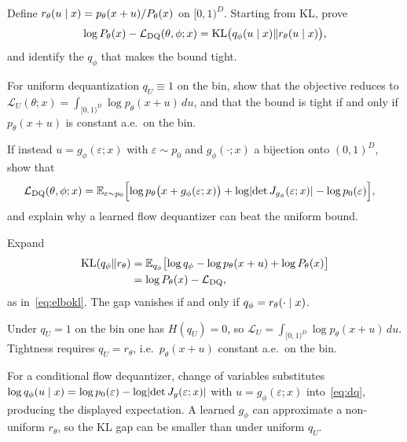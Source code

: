 \begin{hwqbox}
Define $r_\theta(u\mid x)=p_\theta(x+u)/P_\theta(x)$ on $[0,1)^D$. Starting from KL, prove
\[
\log P_\theta(x)-\mathcal L_{\mathrm{DQ}}(\theta,\phi;x)
=\mathrm{KL}\bigl(q_\phi(u\mid x)\Vert r_\theta(u\mid x)\bigr),
\]
and identify the $q_\phi$ that makes the bound tight.

For uniform dequantization $q_U\equiv 1$ on the bin, show that the objective reduces to
$\mathcal L_U(\theta;x)=\int_{[0,1)^D}\log p_\theta(x+u)\,du$, and that the bound is tight if and only if $p_\theta(x+u)$ is constant a.e.\ on the bin.

If instead $u=g_\phi(\varepsilon;x)$ with $\varepsilon\sim p_0$ and $g_\phi(\cdot;x)$ a bijection onto $(0,1)^D$, show that
\begin{align*}
\mathcal L_{\mathrm{DQ}}(\theta,\phi;x)
&=\mathbb{E}_{\varepsilon\sim p_0}\Bigl[
\log p_\theta\bigl(x+g_\phi(\varepsilon;x)\bigr)
+\log\lvert\det J_{g_\phi}(\varepsilon;x)\rvert
-\log p_0(\varepsilon)
\Bigr],
\end{align*}
and explain why a learned flow dequantizer can beat the uniform bound.
\end{hwqbox}
\begin{hwsolbox}
Expand
\begin{align*}
\mathrm{KL}(q_\phi\Vert r_\theta)
&=\mathbb{E}_{q_\phi}\bigl[\log q_\phi-\log p_\theta(x+u)+\log P_\theta(x)\bigr]\\
&=\log P_\theta(x)-\mathcal L_{\mathrm{DQ}},
\end{align*}
as in~\eqref{eq:elbokl}. The gap vanishes if and only if $q_\phi=r_\theta(\cdot\mid x)$.

Under $q_U=1$ on the bin one has $H(q_U)=0$, so
$\mathcal L_U=\int_{[0,1)^D}\log p_\theta(x+u)\,du$. Tightness requires $q_U=r_\theta$, i.e.\ $p_\theta(x+u)$ constant a.e.\ on the bin.

For a conditional flow dequantizer, change of variables substitutes
$\log q_\phi(u\mid x)=\log p_0(\varepsilon)-\log\lvert\det J_g(\varepsilon;x)\rvert$ with $u=g_\phi(\varepsilon;x)$ into~\eqref{eq:dq}, producing the displayed expectation. A learned $g_\phi$ can approximate a non-uniform $r_\theta$, so the KL gap can be smaller than under uniform $q_U$.
\end{hwsolbox}

